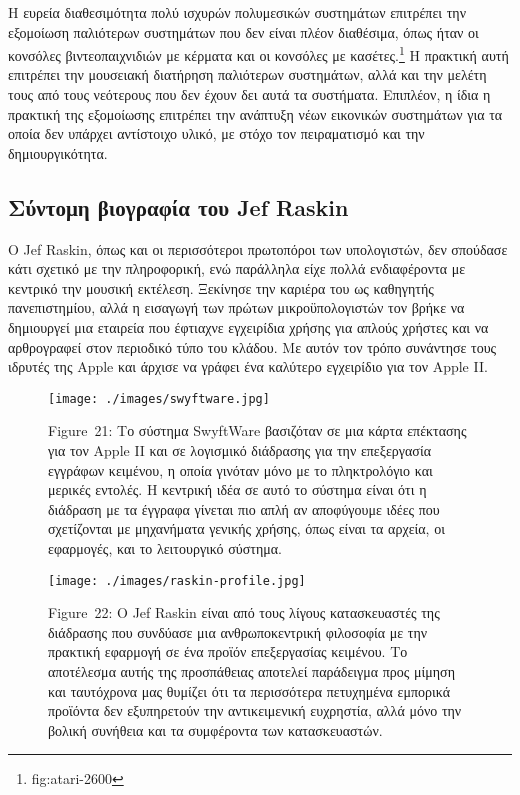 \documentclass[
]{article}
\begin{document}
Η ευρεία διαθεσιμότητα πολύ ισχυρών πολυμεσικών συστημάτων επιτρέπει την
εξομοίωση παλιότερων συστημάτων που δεν είναι πλέον διαθέσιμα, όπως ήταν
οι κονσόλες βιντεοπαιχνιδιών με κέρματα και οι κονσόλες με
κασέτες.\footnote{fig:atari-2600} Η πρακτική αυτή επιτρέπει την
μουσειακή διατήρηση παλιότερων συστημάτων, αλλά και την μελέτη τους από
τους νεότερους που δεν έχουν δει αυτά τα συστήματα. Επιπλέον, η ίδια η
πρακτική της εξομοίωσης επιτρέπει την ανάπτυξη νέων εικονικών συστημάτων
για τα οποία δεν υπάρχει αντίστοιχο υλικό, με στόχο τον πειραματισμό και
την δημιουργικότητα.

\hypertarget{ux3c3ux3cdux3bdux3c4ux3bfux3bcux3b7-ux3b2ux3b9ux3bfux3b3ux3c1ux3b1ux3c6ux3afux3b1-ux3c4ux3bfux3c5-jef-raskin}{%
\subsection{Σύντομη βιογραφία του Jef
Raskin}\label{ux3c3ux3cdux3bdux3c4ux3bfux3bcux3b7-ux3b2ux3b9ux3bfux3b3ux3c1ux3b1ux3c6ux3afux3b1-ux3c4ux3bfux3c5-jef-raskin}}

Ο Jef Raskin, όπως και οι περισσότεροι πρωτοπόροι των υπολογιστών, δεν
σπούδασε κάτι σχετικό με την πληροφορική, ενώ παράλληλα είχε πολλά
ενδιαφέροντα με κεντρικό την μουσική εκτέλεση. Ξεκίνησε την καριέρα του
ως καθηγητής πανεπιστημίου, αλλά η εισαγωγή των πρώτων μικροϋπολογιστών
τον βρήκε να δημιουργεί μια εταιρεία που έφτιαχνε εγχειρίδια χρήσης για
απλούς χρήστες και να αρθρογραφεί στον περιοδικό τύπο του κλάδου. Με
αυτόν τον τρόπο συνάντησε τους ιδρυτές της Apple και άρχισε να γράφει
ένα καλύτερο εγχειρίδιο για τον Apple II.

\leavevmode{}%
\begin{figure}
\hypertarget{fig:swyftware}{%
\centering
\texttt{[image: ./images/swyftware.jpg]}
\caption{Figure~21: Το σύστημα SwyftWare βασιζόταν σε μια κάρτα
επέκτασης για τον Apple II και σε λογισμικό διάδρασης για την
επεξεργασία εγγράφων κειμένου, η οποία γινόταν μόνο με το πληκτρολόγιο
και μερικές εντολές. Η κεντρική ιδέα σε αυτό το σύστημα είναι ότι η
διάδραση με τα έγγραφα γίνεται πιο απλή αν αποφύγουμε ιδέες που
σχετίζονται με μηχανήματα γενικής χρήσης, όπως είναι τα αρχεία, οι
εφαρμογές, και το λειτουργικό σύστημα.}\label{fig:swyftware}
}
\end{figure}

\leavevmode{}%
\begin{figure}
\hypertarget{fig:raskin-profile}{%
\centering
\texttt{[image: ./images/raskin-profile.jpg]}
\caption{Figure~22: Ο Jef Raskin είναι από τους λίγους κατασκευαστές της
διάδρασης που συνδύασε μια ανθρωποκεντρική φιλοσοφία με την πρακτική
εφαρμογή σε ένα προϊόν επεξεργασίας κειμένου. Το αποτέλεσμα αυτής της
προσπάθειας αποτελεί παράδειγμα προς μίμηση και ταυτόχρονα μας θυμίζει
ότι τα περισσότερα πετυχημένα εμπορικά προϊόντα δεν εξυπηρετούν την
αντικειμενική ευχρηστία, αλλά μόνο την βολική συνήθεια και τα συμφέροντα
των κατασκευαστών.}\label{fig:raskin-profile}
}
\end{figure}
\end{document}
